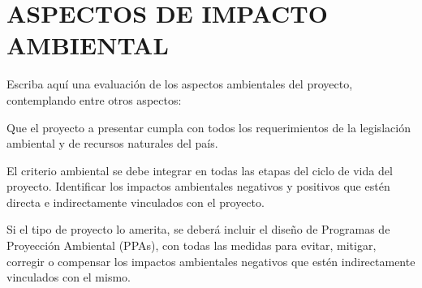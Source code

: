 \section*{ASPECTOS DE IMPACTO AMBIENTAL}
\justifying

Escriba aquí una evaluación de los aspectos ambientales del proyecto, contemplando
entre otros aspectos:

Que el proyecto a presentar cumpla con todos los requerimientos de la legislación
ambiental y de recursos naturales del país.

El criterio ambiental se debe integrar en todas las etapas del ciclo de vida del proyecto. Identificar los impactos ambientales negativos y positivos que estén directa e indirectamente vinculados con el proyecto.

Si el tipo de proyecto lo amerita, se deberá incluir el diseño de Programas de Proyección Ambiental (PPAs), con todas las medidas para evitar, mitigar, corregir o compensar los impactos ambientales negativos que estén indirectamente vinculados con el mismo.